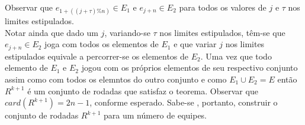 \documentclass[twoside]{article}
\begin{document}
\begin{multicols}{2}
Observar que $e_{1+((j+\tau)\%n)} \in E_1$ e $e_{j+n} \in E_2$ para todos os valores de $j$ e $\tau$ nos limites estipulados.\\
Notar ainda que dado um $j$, variando-se $\tau$ nos limites estipulados, têm-se que $e_{j+n} \in E_2$ joga com todos os elementos de $E_1$ e que variar $j$ nos limites estipulados equivale a percorrer-se os elementos de $E_2$.
Uma vez que todo elemento de $E_1$ e $E_2$ jogou com os próprios elementos de seu respectivo conjunto assim como com todos os elemntos do outro conjunto e como $E_1 \cup E_2 = E$ então $R^{k+1}$ é um conjunto de rodadas que satisfaz o teorema. Observar que $card(R^{k+1}) = 2n-1$, conforme esperado. Sabe-se , portanto, construir o conjunto de rodadas $R^{k+1}$ para um número de equipes.\\


\end{multicols}
\end{document}
